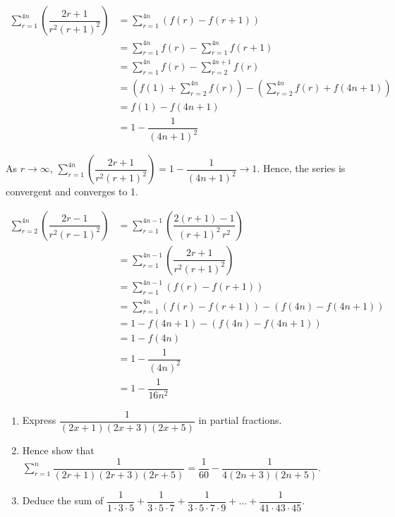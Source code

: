 \documentclass{jhwhw}
\begin{document}
        \begin{align*}
            \sum\limits_{r=1}^{4n} \left(\dfrac{2r+1}{r^2(r+1)^2}\right) &= \sum\limits_{r=1}^{4n} (f(r) - f(r+1))\\
            &= \sum\limits_{r=1}^{4n} f(r) - \sum\limits_{r=1}^{4n} f(r+1)\\
            &= \sum\limits_{r=1}^{4n} f(r) - \sum\limits_{r=2}^{4n+1} f(r)\\
            &= \left(f(1) + \sum\limits_{r=2}^{4n} f(r)\right) - \left(\sum\limits_{r=2}^{4n} f(r) + f(4n+1)\right)\\
            &= f(1) - f(4n+1)\\
            &= 1 - \dfrac{1}{(4n+1)^2}
        \end{align*}

        As $r \rightarrow \infty$, $ \sum\limits_{r=1}^{4n} \left(\dfrac{2r+1}{r^2(r+1)^2}\right) = 1 - \dfrac{1}{(4n+1)^2} \rightarrow 1$. Hence, the series is convergent and converges to 1.


        \begin{align*}
            \sum\limits_{r=2}^{4n} \left(\dfrac{2r-1}{r^2(r-1)^2}\right) &= \sum\limits_{r=1}^{4n-1} \left(\dfrac{2(r+1)-1}{(r+1)^2 \, r^2}\right)\\
            &= \sum\limits_{r=1}^{4n-1} \left(\dfrac{2r+1}{r^2(r+1)^2}\right)\\
            &= \sum\limits_{r=1}^{4n-1} (f(r) - f(r+1))\\
            &= \sum\limits_{r=1}^{4n} (f(r) - f(r+1)) - (f(4n) - f(4n+1))\\
            &= 1 - f(4n+1) - (f(4n) - f(4n+1))\\
            &= 1 - f(4n)\\
            &= 1 - \dfrac1{(4n)^2}\\
            &= 1 - \dfrac1{16n^2}
        \end{align*}


    \problem{}
        \begin{enumerate}
            \item Express $\dfrac1{(2x+1)(2x+3)(2x+5)}$ in partial fractions.
            \item Hence show that $\sum\limits_{r=1}^n \dfrac1{(2r+1)(2r+3)(2r+5)} = \dfrac1{60} - \dfrac1{4(2n+3)(2n+5)}$.
            \item Deduce the sum of $\dfrac1{1\cdot 3\cdot5} + \dfrac1{3 \cdot 5 \cdot 7} + \dfrac1{3 \cdot 5 \cdot 7 \cdot 9} + \ldots + \dfrac1{41 \cdot 43 \cdot 45}$.
        \end{enumerate}
\end{document}
